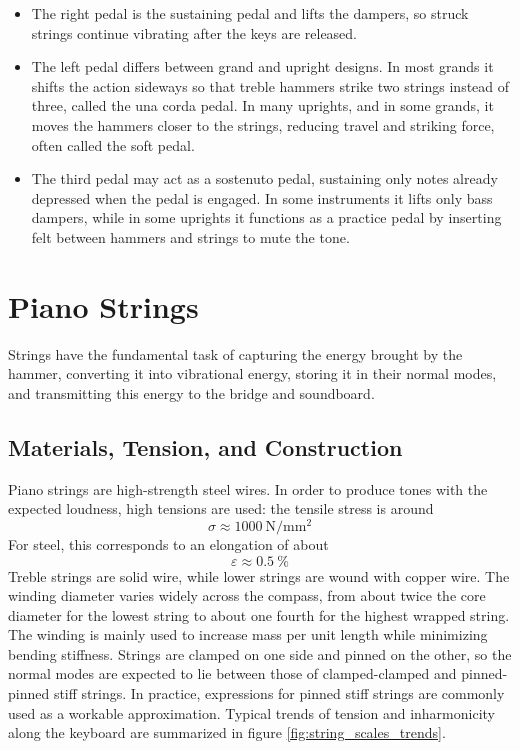 \begin{itemize}
    \item The right pedal is the sustaining pedal and lifts the dampers, so struck strings continue vibrating after the keys are released.
    \item The left pedal differs between grand and upright designs. In most grands it shifts the action sideways so that treble hammers strike two strings instead of three, called the una corda pedal. In many uprights, and in some grands, it moves the hammers closer to the strings, reducing travel and striking force, often called the soft pedal.
    \item The third pedal may act as a sostenuto pedal, sustaining only notes already depressed when the pedal is engaged. In some instruments it lifts only bass dampers, while in some uprights it functions as a practice pedal by inserting felt between hammers and strings to mute the tone.
\end{itemize}

\section{Piano Strings}

Strings have the fundamental task of capturing the energy brought by the hammer, converting it into vibrational energy, storing it in their normal modes, and transmitting this energy to the bridge and soundboard.

\subsection{Materials, Tension, and Construction} 

Piano strings are high-strength steel wires. In order to produce tones with the expected loudness, high tensions are used: the tensile stress is around
\[
\sigma \approx \SI{1000}{\newton\per\milli\meter\squared}
\]
For steel, this corresponds to an elongation of about
\[
\varepsilon \approx \SI{0.5}{\percent}
\]
Treble strings are solid wire, while lower strings are wound with copper wire. The winding diameter varies widely across the compass, from about twice the core diameter for the lowest string to about one fourth for the highest wrapped string. The winding is mainly used to increase mass per unit length while minimizing bending stiffness. Strings are clamped on one side and pinned on the other, so the normal modes are expected to lie between those of clamped-clamped and pinned-pinned stiff strings. In practice, expressions for pinned stiff strings are commonly used as a workable approximation. Typical trends of tension and inharmonicity along the keyboard are summarized in figure \ref{fig:string_scales_trends}.

